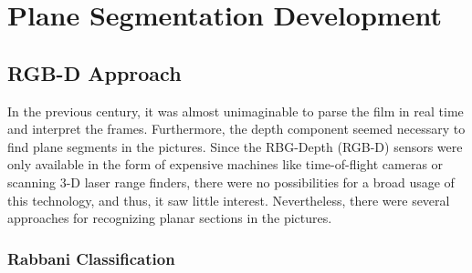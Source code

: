 
\chapter{Plane Segmentation Development} \label{chap:plane-segmentation-development}

\section{RGB-D Approach}

In the previous century, it was almost unimaginable to parse the film in real time and interpret the frames.
Furthermore, the depth component seemed necessary to find plane segments in the pictures.
Since the RBG-Depth (RGB-D) sensors were only available in the form of expensive machines
like time-of-flight cameras or scanning 3-D laser range finders, \cite{articleFPSLinePrimitivesRGBD}
there were no possibilities for a broad usage of this technology, and thus, it saw little interest.
Nevertheless, there were several approaches for recognizing planar sections in the pictures.

\subsection{Rabbani Classification}

